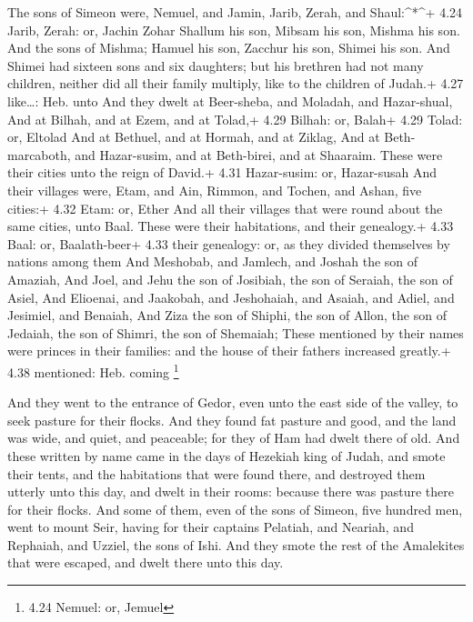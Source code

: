  The sons of Simeon were, Nemuel, and Jamin, Jarib, Zerah,
and Shaul:\^{}*\^{}+ 4.24 Jarib, Zerah: or, Jachin Zohar 
Shallum his son, Mibsam his son, Mishma his son.  And the
sons of Mishma; Hamuel his son, Zacchur his son, Shimei his son.
 And Shimei had sixteen sons and six daughters; but his
brethren had not many children, neither did all their family multiply,
like to the children of Judah.+ 4.27 like\ldots: Heb. unto 
And they dwelt at Beer-sheba, and Moladah, and Hazar-shual,
 And at Bilhah, and at Ezem, and at Tolad,+ 4.29 Bilhah:
or, Balah+ 4.29 Tolad: or, Eltolad  And at Bethuel, and at
Hormah, and at Ziklag,  And at Beth-marcaboth, and
Hazar-susim, and at Beth-birei, and at Shaaraim. These were their cities
unto the reign of David.+ 4.31 Hazar-susim: or, Hazar-susah
 And their villages were, Etam, and Ain, Rimmon, and
Tochen, and Ashan, five cities:+ 4.32 Etam: or, Ether  And
all their villages that were round about the same cities, unto Baal.
These were their habitations, and their genealogy.+ 4.33 Baal: or,
Baalath-beer+ 4.33 their genealogy: or, as they divided themselves by
nations among them  And Meshobab, and Jamlech, and Joshah
the son of Amaziah,  And Joel, and Jehu the son of
Josibiah, the son of Seraiah, the son of Asiel,  And
Elioenai, and Jaakobah, and Jeshohaiah, and Asaiah, and Adiel, and
Jesimiel, and Benaiah,  And Ziza the son of Shiphi, the son
of Allon, the son of Jedaiah, the son of Shimri, the son of Shemaiah;
 These mentioned by their names were princes in their
families: and the house of their fathers increased greatly.+ 4.38
mentioned: Heb. coming \footnote{4.24 Nemuel: or, Jemuel}

 And they went to the entrance of Gedor, even unto the east
side of the valley, to seek pasture for their flocks.  And
they found fat pasture and good, and the land was wide, and quiet, and
peaceable; for they of Ham had dwelt there of old.  And
these written by name came in the days of Hezekiah king of Judah, and
smote their tents, and the habitations that were found there, and
destroyed them utterly unto this day, and dwelt in their rooms: because
there was pasture there for their flocks.  And some of
them, even of the sons of Simeon, five hundred men, went to mount Seir,
having for their captains Pelatiah, and Neariah, and Rephaiah, and
Uzziel, the sons of Ishi.  And they smote the rest of the
Amalekites that were escaped, and dwelt there unto this day.

